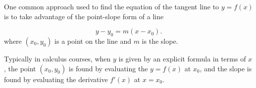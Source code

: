 \documentclass{ximera}
\begin{document}
\begin{image}

\end{image}

One common approach used to find the equation of the tangent line to $y=f(x)$ is to take advantage of the point-slope form of a line

\[
y-y_0=m\left(x-x_0\right).
\]
where $(x_0,y_0)$ is a point on the line and $m$ is the slope.

Typically in calculus courses, when $y$ is given by an explicit formula in terms of $x$, the point $(x_0,y_0)$ is found by evaluating the $y=f(x)$ at $x_0$, and the slope is found by evaluating the derivative $f'(x)$ at $x=x_0$.
\end{document}
